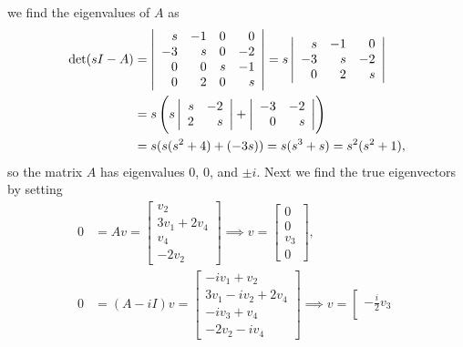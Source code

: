 \documentclass{article}
\begin{document}
\begin{enumerate}[(a)]
{we find the eigenvalues of $A$ as
\begin{align*}
\det (sI - A)
&= \left|\begin{array}{r r r r}
      s & -1 & 0 &  0 \\
     -3 &  s & 0 & -2 \\
      0 &  0 & s & -1 \\
      0 &  2 & 0 &  s
  \end{array}\right|
 = s\left|\begin{array}{r r r}
      s & -1 &  0 \\
     -3 &  s & -2 \\
      0 &  2 &  s
    \end{array}\right| \\
&= s\left(
     s\left|\begin{array}{r r}
        s & -2 \\ 2 & s
      \end{array}\right|
   +  \left|\begin{array}{r r}
        -3 & -2 \\ 0 & s
      \end{array}\right|\right) \\
&= s(s(s^2 +4) + (-3s))
 = s(s^3 + s) = s^2(s^2 + 1),
\end{align*}
so the matrix $A$ has eigenvalues 0, 0, and $\pm i$. Next we find the
true eigenvectors by setting
\begin{align*}
   0 
&= Av
 = \left[\begin{array}{c}
     v_2 \\ 3v_1 + 2v_4 \\ v_4 \\ -2v_2
   \end{array}\right]
\implies
  v = \left[\begin{array}{c}
        0 \\ 0 \\ v_3 \\ 0
      \end{array}\right], \\
   0
&= (A - iI)v
 = \left[\begin{array}{c}
     -i v_1 + v_2 \\
      3 v_1 - i v_2 + 2 v_4  \\
     -i v_3 + v_4 \\
     -2 v_2 - i v_4
   \end{array}\right]
\implies
  v = \left[\begin{array}{c}
        -\frac{i}{2} v_3 \\

\end{array}
\end{align*}}
\end{enumerate}
\end{document}
